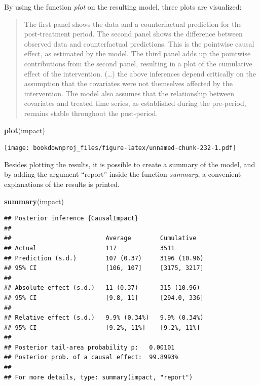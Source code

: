 \documentclass[
]{article}
\newenvironment{Shaded}{\begin{snugshade}}{\end{snugshade}}
\newcommand{\KeywordTok}[1]{\textcolor[rgb]{0.13,0.29,0.53}{\textbf{#1}}}
\newcommand{\NormalTok}[1]{#1}
\begin{document}
By using the function \emph{plot} on the resulting model, three plots are visualized:

\begin{quote}
The first panel shows the data and a counterfactual prediction for the post-treatment period. The second panel shows the difference between observed data and counterfactual predictions. This is the pointwise causal effect, as estimated by the model. The third panel adds up the pointwise contributions from the second panel, resulting in a plot of the cumulative effect of the intervention. (\ldots) the above inferences depend critically on the assumption that the covariates were not themselves affected by the intervention. The model also assumes that the relationship between covariates and treated time series, as established during the pre-period, remains stable throughout the post-period.
\end{quote}

\begin{Shaded}
\begin{Highlighting}[]
\KeywordTok{plot}\NormalTok{(impact)}
\end{Highlighting}
\end{Shaded}

\texttt{[image: bookdownproj\_files/figure-latex/unnamed-chunk-232-1.pdf]}

Besides plotting the results, it is possible to create a summary of the model, and by adding the argument ``report'' inside the function \emph{summary}, a convenient explanations of the results is printed.

\begin{Shaded}
\begin{Highlighting}[]
\KeywordTok{summary}\NormalTok{(impact)}
\end{Highlighting}
\end{Shaded}

\begin{verbatim}
## Posterior inference {CausalImpact}
## 
##                          Average        Cumulative  
## Actual                   117            3511        
## Prediction (s.d.)        107 (0.37)     3196 (10.96)
## 95% CI                   [106, 107]     [3175, 3217]
##                                                     
## Absolute effect (s.d.)   11 (0.37)      315 (10.96) 
## 95% CI                   [9.8, 11]      [294.0, 336]
##                                                     
## Relative effect (s.d.)   9.9% (0.34%)   9.9% (0.34%)
## 95% CI                   [9.2%, 11%]    [9.2%, 11%] 
## 
## Posterior tail-area probability p:   0.00101
## Posterior prob. of a causal effect:  99.8993%
## 
## For more details, type: summary(impact, "report")
\end{verbatim}
\end{document}
